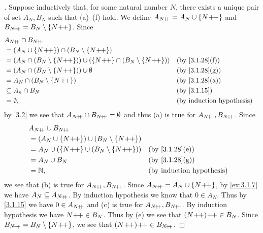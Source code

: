 \begin{proof}[]
	Suppose inductively that, for some natural number \(N\), there exists a unique pair of set \(A_N, B_N\) such that (a)--(f) hold.
	We define \(A_{N\!+\!\!+} = A_N \cup \left\lbrace N\!+\!\!+\right\rbrace\) and \(B_{N\!+\!\!+} = B_N \setminus \left\lbrace N\!+\!\!+\right\rbrace\).
	Since
	\begin{align*}
		 & A_{N\pp} \cap B_{N\pp}                                                                                        \\
		 & = (A_N \cup \set{N\pp}) \cap (B_N \setminus \set{N\pp})                                                       \\
		 & = (A_N \cap (B_N \setminus \set{N\pp})) \cup (\set{N\pp} \cap (B_N \setminus \set{N\pp})) &  & \by{3.1.28}[f] \\
		 & = (A_N \cap (B_N \setminus \set{N\pp})) \cup \emptyset                                    &  & \by{3.1.28}[g] \\
		 & = A_N \cap (B_N \setminus \set{N\pp})                                                     &  & \by{3.1.28}[a] \\
		 & \subseteq A_n \cap B_N                                                                    &  & \by{3.1.15}    \\
		 & = \emptyset,                                                                              &  & \byIH
	\end{align*}
	by \cref{3.2} we see that \(A_{N\!+\!\!+} \cap B_{N\!+\!\!+} = \emptyset\) and thus (a) is true for \(A_{N\!+\!\!+}, B_{N\!+\!\!+}\).
	Since
	\begin{align*}
		 & A_{N\pp} \cup B_{N\pp}                                                      \\
		 & = (A_N \cup \set{N\pp}) \cup (B_N \setminus \set{N\pp})                     \\
		 & = A_N \cup (\set{N\pp} \cup (B_N \setminus \set{N\pp})) &  & \by{3.1.28}[e] \\
		 & = A_N \cup B_N                                          &  & \by{3.1.28}[g] \\
		 & = \N,                                                   &  & \byIH
	\end{align*}
	we see that (b) is true for \(A_{N\!+\!\!+}, B_{N\!+\!\!+}\).
	Since \(A_{N\!+\!\!+} = A_N \cup \left\lbrace N\!+\!\!+\right\rbrace\), by \cref{ex:3.1.7} we have \(A_N \subseteq A_{N\!+\!\!+}\).
	By induction hypothesis we know that \(0 \in A_N\).
	Thus by \cref{3.1.15} we have \(0 \in A_{N\!+\!\!+}\) and (c) is true for \(A_{N\!+\!\!+}, B_{N\!+\!\!+}\).
	By induction hypothesis we have \(N\!+\!\!+ \in B_N\).
	Thus by (e) we see that \((N\!+\!\!+)\!+\!\!+ \in B_N\).
	Since \(B_{N\!+\!\!+} = B_N \setminus \left\lbrace N\!+\!\!+\right\rbrace\), we see that \((N\pp)\pp \in B_{N\pp}\).

\end{proof}
